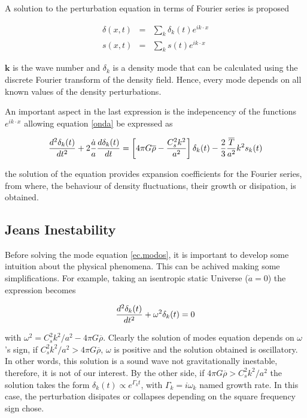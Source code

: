 A solution to the perturbation equation in terms of Fourier series is proposed

\begin{eqnarray}
\delta(x,t) &=& \sum_k \delta_k(t)e^{ik\cdot x} \nonumber\\
s(x,t) &=& \sum_k s(t)e^{ik\cdot x} \nonumber
\end{eqnarray}

$\textbf{k}$ is the wave number and $\delta_k$ is 
a density mode that can be calculated using the discrete Fourier transform
of the density field. Hence, every mode depends on all known values
of the density perturbations. 

An important aspect in the last expression is the indepencency of the 
functions $e^{ik\cdot x}$ allowing equation \ref{onda} be expressed as 

\begin{equation}
\frac{d^2\delta_k(t)}{dt^2}+2\frac{\dot{a}}{a}\frac{d \delta_k(t)}{d t} = 
\left[4\pi G\overline{\rho}-\frac{C_s^2 k^2}{a^2}\right]\delta_k(t)
-\frac{2}{3}\frac{\overline{T}}{a^2}k^2s_k(t)
\label{ec.modos}
\end{equation}

the solution of the equation provides expansion coefficients for the Fourier series,
from where, the behaviour of density fluctuations, their growth or 
disipation, is obtained. 

\subsection{ Jeans Inestability}

Before solving the mode equation \ref{ec.modos}, it is important to develop
some intuition about the	 physical phenomena. This can be achived making some 
simplifications. For example, taking an isentropic static Universe ($\dot{a}=0$)
the expression becomes

\[
\frac{d^2\delta_k(t)}{dt^2} + \omega^2\delta_k(t) = 0
\]

with $\omega^2 = C_s^2k^2/a^2-4\pi G\overline{\rho}$. Clearly the solution of modes 
equation depends on $\omega$'s sign, if $C_s^2k^2/a^2>4\pi G\overline{\rho}$,  
$\omega$ is positive and the solution obtained is oscillatory. In other words, 
this solution is a sound wave not gravitationally inestable, therefore, it is
not of our interest. 
By the other side, if $4\pi G\overline{\rho}>C_s^2k^2/a^2$ the solution takes
the form $\delta_k(t)\propto e^{\Gamma_k t}$, with $\Gamma_k=i\omega_k$ named
growth rate. In this case, the perturbation disipates or collapses depending
on the square frequency sign chose. 

